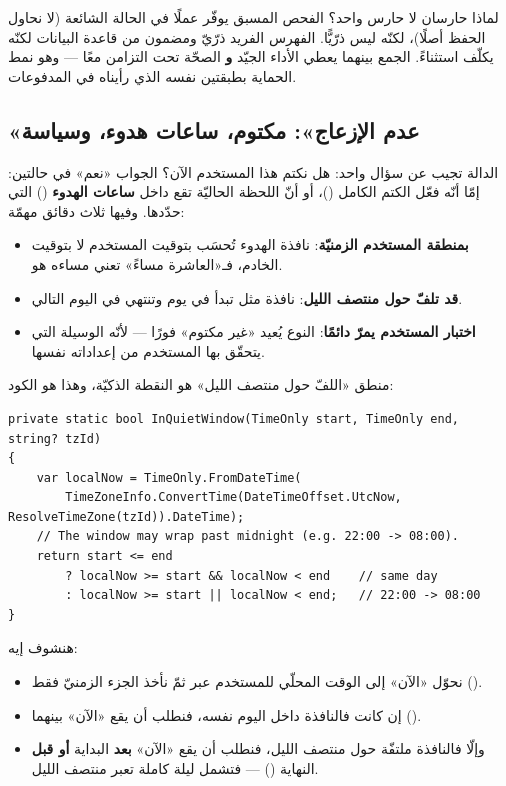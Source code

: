 \begin{why}
لماذا حارسان لا حارس واحد؟ الفحص المسبق يوفّر عملًا في الحالة الشائعة (لا نحاول
الحفظ أصلًا)، لكنّه ليس ذرّيًّا. الفهرس الفريد ذرّيّ ومضمون من قاعدة البيانات لكنّه
يكلّف استثناءً. الجمع بينهما يعطي الأداء الجيّد \textbf{و} الصحّة تحت التزامن معًا —
وهو نمط الحماية بطبقتين نفسه الذي رأيناه في المدفوعات.
\end{why}

\subsection{«عدم الإزعاج»: مكتوم، ساعات هدوء، وسياسة }

الدالة  تجيب عن سؤال واحد: هل نكتم هذا المستخدم الآن؟ الجواب
«نعم» في حالتين: إمّا أنّه فعّل الكتم الكامل ()، أو أنّ
اللحظة الحاليّة تقع داخل \textbf{ساعات الهدوء} () التي حدّدها.
وفيها ثلاث دقائق مهمّة:

\begin{itemize}
\item \textbf{بمنطقة المستخدم الزمنيّة}: نافذة الهدوء تُحسَب بتوقيت المستخدم لا
  بتوقيت الخادم، فـ«العاشرة مساءً» تعني مساءه هو.
\item \textbf{قد تلفّ حول منتصف الليل}: نافذة مثل 
  تبدأ في يوم وتنتهي في اليوم التالي.
\item \textbf{اختبار المستخدم يمرّ دائمًا}: النوع  يُعيد «غير مكتوم»
  فورًا — لأنّه الوسيلة التي يتحقّق بها المستخدم من إعداداته نفسها.
\end{itemize}

منطق «اللفّ حول منتصف الليل» هو النقطة الذكيّة، وهذا هو الكود:

\begin{english}
\begin{lstlisting}[language={[Sharp]C}]
private static bool InQuietWindow(TimeOnly start, TimeOnly end, string? tzId)
{
    var localNow = TimeOnly.FromDateTime(
        TimeZoneInfo.ConvertTime(DateTimeOffset.UtcNow, ResolveTimeZone(tzId)).DateTime);
    // The window may wrap past midnight (e.g. 22:00 -> 08:00).
    return start <= end
        ? localNow >= start && localNow < end    // same day
        : localNow >= start || localNow < end;   // 22:00 -> 08:00
}
\end{lstlisting}
\end{english}

هنشوف إيه:
\begin{itemize}
\item نحوّل «الآن»  إلى الوقت المحلّي للمستخدم عبر  ثمّ
  نأخذ الجزء الزمنيّ فقط ().
\item إن كانت  فالنافذة داخل اليوم نفسه، فنطلب أن يقع «الآن»
  بينهما ().
\item وإلّا فالنافذة ملتفّة حول منتصف الليل، فنطلب أن يقع «الآن» \textbf{بعد} البداية
  \textbf{أو قبل} النهاية () — فتشمل ليلة كاملة تعبر منتصف الليل.
\end{itemize}

